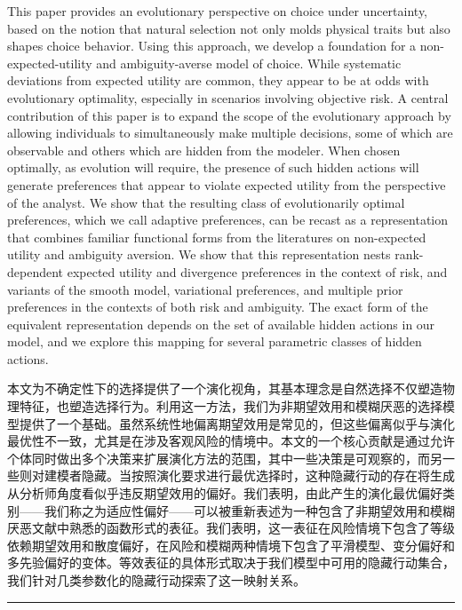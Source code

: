 \documentclass[12pt,a4paper]{article}
\newenvironment{original}
  {\par\noindent\color{black}\smallskip}
  {\par\smallskip}
\newenvironment{translation}
  {\par\noindent\color{blue!70!black}\smallskip}
  {\par\medskip\hrule\medskip}
\begin{document}
\begin{original}
This paper provides an evolutionary perspective on choice under uncertainty, based on the notion that natural selection not only molds physical traits but also shapes choice behavior. Using this approach, we develop a foundation for a non-expected-utility and ambiguity-averse model of choice. While systematic deviations from expected utility are common, they appear to be at odds with evolutionary optimality, especially in scenarios involving objective risk. A central contribution of this paper is to expand the scope of the evolutionary approach by allowing individuals to simultaneously make multiple decisions, some of which are observable and others which are hidden from the modeler. When chosen optimally, as evolution will require, the presence of such hidden actions will generate preferences that appear to violate expected utility from the perspective of the analyst. We show that the resulting class of evolutionarily optimal preferences, which we call adaptive preferences, can be recast as a representation that combines familiar functional forms from the literatures on non-expected utility and ambiguity aversion. We show that this representation nests rank-dependent expected utility and divergence preferences in the context of risk, and variants of the smooth model, variational preferences, and multiple prior preferences in the contexts of both risk and ambiguity. The exact form of the equivalent representation depends on the set of available hidden actions in our model, and we explore this mapping for several parametric classes of hidden actions.
\end{original}
\begin{translation}
本文为不确定性下的选择提供了一个演化视角，其基本理念是自然选择不仅塑造物理特征，也塑造选择行为。利用这一方法，我们为非期望效用和模糊厌恶的选择模型提供了一个基础。虽然系统性地偏离期望效用是常见的，但这些偏离似乎与演化最优性不一致，尤其是在涉及客观风险的情境中。本文的一个核心贡献是通过允许个体同时做出多个决策来扩展演化方法的范围，其中一些决策是可观察的，而另一些则对建模者隐藏。当按照演化要求进行最优选择时，这种隐藏行动的存在将生成从分析师角度看似乎违反期望效用的偏好。我们表明，由此产生的演化最优偏好类别——我们称之为适应性偏好——可以被重新表述为一种包含了非期望效用和模糊厌恶文献中熟悉的函数形式的表征。我们表明，这一表征在风险情境下包含了等级依赖期望效用和散度偏好，在风险和模糊两种情境下包含了平滑模型、变分偏好和多先验偏好的变体。等效表征的具体形式取决于我们模型中可用的隐藏行动集合，我们针对几类参数化的隐藏行动探索了这一映射关系。
\end{translation}
\end{document}
